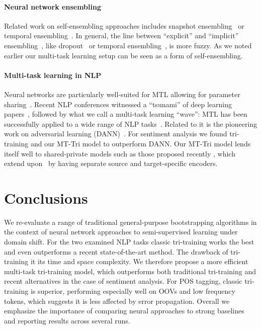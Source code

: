 \documentclass[11pt,a4paper]{article}
\begin{document}
\paragraph{Neural network ensembling} Related work on self-ensembling approaches includes snapshot ensembling~\cite{Huang2017c} or temporal ensembling~\cite{Laine2017}. In general, the line between ``explicit'' and ``implicit'' ensembling~\cite{Huang2017c}, like dropout~\cite{Srivastava2014} or temporal ensembling~\cite{Saito2017}, is more fuzzy. As we noted earlier our multi-task learning setup can be seen as a form of self-ensembling.

\paragraph{Multi-task learning in NLP} Neural networks are particularly well-suited for MTL allowing for parameter sharing~\cite{Caruana1993}. Recent NLP conferences witnessed a ``tsunami'' of deep learning papers~\cite{manning2015computational}, followed by what we call a multi-task learning ``wave'':
MTL has been successfully applied to a wide range of NLP tasks~\cite{cohn2013modelling,Hao2015,luong2015multi,Plank2016,fang2016learning,sogaard-goldberg:2016:P16-2,Ruder2017c,Augenstein2018}. 
Related to it is the pioneering work on adversarial learning (DANN)~\cite{Ganin2016}. For sentiment analysis we found tri-training and our MT-Tri model to outperform DANN. Our MT-Tri model lends itself well to shared-private models such as those proposed recently \cite{Liu:ea:2017:ACL,Kim2017b}, which extend upon~\cite{Ganin2016} by having separate source and target-specific encoders.

\section{Conclusions}

We re-evaluate a range of traditional general-purpose bootstrapping algorithms in the context of neural network approaches to semi-supervised learning under domain shift. For the two examined NLP tasks classic tri-training works the best and even outperforms a recent state-of-the-art method. The drawback of tri-training it its time and space complexity. We therefore propose a more efficient multi-task tri-training model, which outperforms both traditional tri-training and recent alternatives in the case of sentiment analysis. For POS tagging, classic tri-training is superior, performing especially well on OOVs and low frequency tokens, which suggests it is less affected by error propagation. Overall we emphasize the importance of comparing neural approaches to strong baselines and reporting results across several runs.
\end{document}
